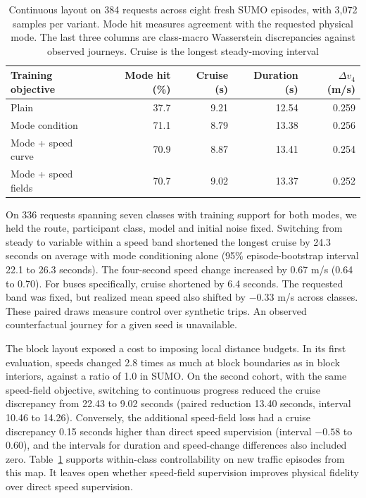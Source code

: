 \begin{table}[htbp]
\centering\small
\begin{tabular}{lrrrr}
\toprule
Training objective & Mode hit (\%) & Cruise (s) & Duration (s) & $\Delta v_4$ (m/s)\\
\midrule
Plain & 37.7 & 9.21 & 12.54 & 0.259\\
Mode condition & 71.1 & 8.79 & 13.38 & 0.256\\
Mode + speed curve & 70.9 & 8.87 & 13.41 & 0.254\\
Mode + speed fields & 70.7 & 9.02 & 13.37 & 0.252\\
\bottomrule
\end{tabular}
\caption{Continuous layout on 384 requests across eight fresh SUMO episodes, with 3,072 samples per variant. Mode hit measures agreement with the requested physical mode. The last three columns are class-macro Wasserstein discrepancies against observed journeys. Cruise is the longest steady-moving interval}
\label{tab:mode-training}
\end{table}

On 336 requests spanning seven classes with training support for both modes, we held the route, participant class, model and initial noise fixed. Switching from steady to variable within a speed band shortened the longest cruise by 24.3 seconds on average with mode conditioning alone (95\% episode-bootstrap interval 22.1 to 26.3 seconds). The four-second speed change increased by 0.67 m/s (0.64 to 0.70). For buses specifically, cruise shortened by 6.4 seconds. The requested band was fixed, but realized mean speed also shifted by $-0.33$ m/s across classes. These paired draws measure control over synthetic trips. An observed counterfactual journey for a given seed is unavailable.

The block layout exposed a cost to imposing local distance budgets. In its first evaluation, speeds changed 2.8 times as much at block boundaries as in block interiors, against a ratio of 1.0 in SUMO. On the second cohort, with the same speed-field objective, switching to continuous progress reduced the cruise discrepancy from 22.43 to 9.02 seconds (paired reduction 13.40 seconds, interval 10.46 to 14.26). Conversely, the additional speed-field loss had a cruise discrepancy 0.15 seconds higher than direct speed supervision (interval $-0.58$ to 0.60), and the intervals for duration and speed-change differences also included zero. Table~\ref{tab:mode-training} supports within-class controllability on new traffic episodes from this map. It leaves open whether speed-field supervision improves physical fidelity over direct speed supervision.


